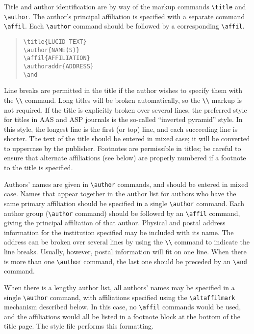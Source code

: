 Title and author identification are by way of the markup commands
\verb"\title" and \verb"\author".
The author's principal affiliation is specified with
a separate command \verb"\affil".
Each \verb"\author" command
should be followed by a corresponding \verb"\affil".
\begin{quote}
\verb"\title{LUCID TEXT}"\\[.5ex]
\verb"\author{NAME(S)}"\\
\verb"\affil{AFFILIATION}"\\
\verb"\authoraddr{ADDRESS}"\\[.5ex]
\verb"\and"
\end{quote}

Line breaks are permitted in the title if the author wishes
to specify them with the \verb"\\" command.  Long titles will
be broken automatically, so the \verb"\\" markup is not required.
If the title is explicitly broken over several lines, the
preferred style for titles in AAS and ASP journals is the so-called
``inverted pyramid'' style.  In this style, the longest line
is the first (or top) line, and each succeeding line is shorter.
The text of the title should be entered in mixed case;
it will be converted to uppercase by the publisher.
Footnotes are permissible in titles; be careful to ensure that
alternate affiliations (see below) are properly numbered if a
footnote to the title is specified.

Authors' names are given in \verb"\author" commands,
and should be entered in mixed case.
Names that appear together in the author list for authors who
have the same primary affiliation should be specified in a single
\verb"\author" command.
Each author group (\verb"\author" command)
should be followed by an \verb"\affil" command, giving the principal
affiliation of that author.  Physical and postal address information
for the institution specified may be included with its name.
The address can be broken over several lines by using the
\verb"\\" command to indicate the line breaks.
Usually, however, postal information will fit on one line.
When there is more than one \verb"\author" command, the last
one should be preceded by an \verb"\and" command.

When there is a lengthy author list, all authors' names may be
specified in a single \verb"\author" command, with affiliations
specified using the \verb"\altaffilmark" mechanism described below.
In this case, no \verb"\affil" commands would be used, and the
affiliations would all be listed in a footnote block at the bottom
of the title page.  The style file performs this formatting.

